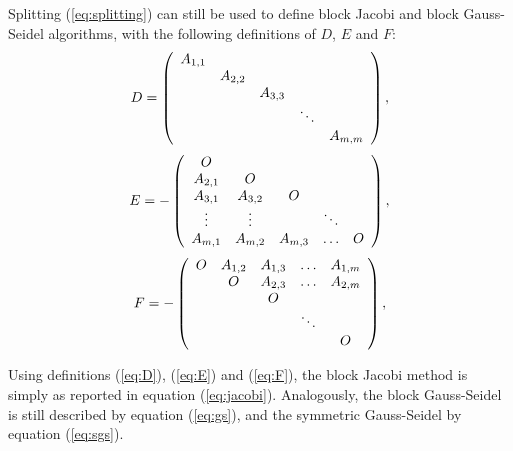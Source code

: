 Splitting (\ref{eq:splitting}) can still be used to define block Jacobi
and block Gauss-Seidel algorithms, with the following definitions of $D$, $E$
and $F$:
\begin{equation}
\label{eq:D}
D = 
\left(
\begin{array}{c c c c c}
A_{1,1} &         &         &        &          \\
        & A_{2,2} &         &        &          \\
        &         & A_{3,3} &        &          \\
        &         &         & \ddots &         \\
        &         &         &        & A_{m,m} \\
\end{array}
\right), 
\end{equation}
\begin{equation}
\label{eq:E}
E =  -
\left(
\begin{array}{c c c c c}
 O      &         &         &        &          \\
A_{2,1} & O       &         &        &          \\
A_{3,1} & A_{3,2} & O       &        &          \\
 \vdots & \vdots  &         & \ddots &         \\
A_{m,1} & A_{m,2} & A_{m,3} & \ldots &     O    \\
\end{array}
\right), 
\end{equation}
\begin{equation}
\label{eq:F}
F =  -
\left(
\begin{array}{c c c c c}
 O      & A_{1,2} & A_{1,3} & \ldots & A_{1,m}  \\
        & O       & A_{2,3} & \ldots & A_{2,m}  \\
        &         & O       &        &          \\
        &         &         & \ddots &         \\
        &         &         &        &     O    \\
\end{array}
\right), 
\end{equation}

Using definitions (\ref{eq:D}), (\ref{eq:E}) and (\ref{eq:F}), the block
Jacobi method is simply as reported in equation (\ref{eq:jacobi}). Analogously,
the block Gauss-Seidel is still described by equation (\ref{eq:gs}), and
the symmetric Gauss-Seidel by equation (\ref{eq:sgs}).

